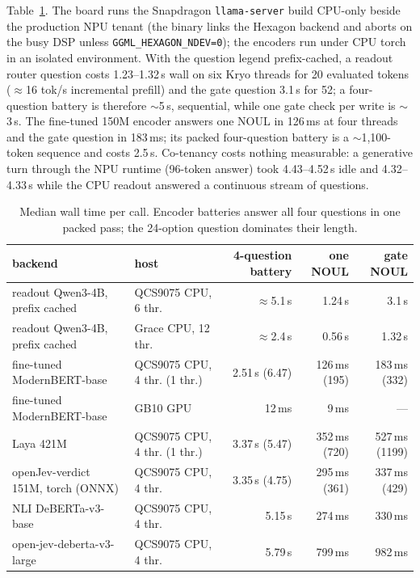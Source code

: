 \documentclass[11pt]{article}
\begin{document}
Table~\ref{tab:latency}. The board runs the Snapdragon \texttt{llama-server} build CPU-only
beside the production NPU tenant (the binary links the Hexagon backend and aborts on the busy DSP
unless \texttt{GGML\_HEXAGON\_NDEV=0}); the encoders run under CPU torch in an isolated
environment. With the question legend prefix-cached, a readout router question costs
1.23--1.32\,s wall on six Kryo threads for 20 evaluated tokens ($\approx$16 tok/s incremental
prefill) and the gate question 3.1\,s for 52; a four-question battery is therefore $\sim$5\,s,
sequential, while one gate check per write is $\sim$3\,s. The fine-tuned 150M encoder answers one
NOUL in 126\,ms at four threads and the gate question in 183\,ms; its packed four-question battery
is a $\sim$1,100-token sequence and costs 2.5\,s. Co-tenancy costs nothing measurable: a
generative turn through the NPU runtime (96-token answer) took 4.43--4.52\,s idle and
4.32--4.33\,s while the CPU readout answered a continuous stream of questions.

\begin{table}[t]\centering\footnotesize\setlength{\tabcolsep}{4pt}
\begin{tabular}{llrrr}
\toprule
backend & host & 4-question battery & one NOUL & gate NOUL \\
\midrule
readout Qwen3-4B, prefix cached & QCS9075 CPU, 6 thr. & $\approx$5.1\,s & 1.24\,s & 3.1\,s \\
readout Qwen3-4B, prefix cached & Grace CPU, 12 thr. & $\approx$2.4\,s & 0.56\,s & 1.32\,s \\
fine-tuned ModernBERT-base & QCS9075 CPU, 4 thr. (1 thr.) & 2.51\,s (6.47) & 126\,ms (195) & 183\,ms (332) \\
fine-tuned ModernBERT-base & GB10 GPU & 12\,ms & 9\,ms & --- \\
Laya 421M & QCS9075 CPU, 4 thr. (1 thr.) & 3.37\,s (5.47) & 352\,ms (720) & 527\,ms (1199) \\
openJev-verdict 151M, torch (ONNX) & QCS9075 CPU, 4 thr. & 3.35\,s (4.75) & 295\,ms (361) & 337\,ms (429) \\
NLI DeBERTa-v3-base & QCS9075 CPU, 4 thr. & 5.15\,s & 274\,ms & 330\,ms \\
open-jev-deberta-v3-large & QCS9075 CPU, 4 thr. & 5.79\,s & 799\,ms & 982\,ms \\
\bottomrule
\end{tabular}
\caption{Median wall time per call. Encoder batteries answer all four questions in one packed
pass; the 24-option question dominates their length.}
\label{tab:latency}
\end{table}
\end{document}
